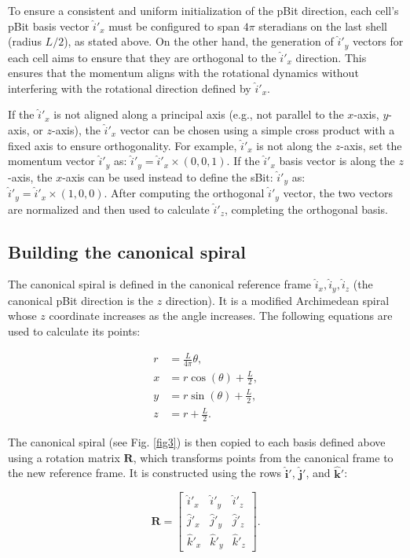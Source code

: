 \documentclass[12pt,english]{article}
\begin{document}
To ensure a consistent and uniform initialization of the pBit direction, each cell's pBit basis vector $\hat{i}'_x$ must be configured to span $4\pi$ steradians on the last shell (radius $L/2$), as stated above. On the other hand, the generation of $\hat{i}'_y$ vectors for each cell aims to ensure that they are orthogonal to the $\hat{i}'_x$ direction. This ensures that the momentum aligns with the rotational dynamics without interfering with the rotational direction defined by $\hat{i}'_x$.

If the $\hat{i}'_x$ is not aligned along a principal axis (e.g., not parallel to the $x$-axis, $y$-axis, or $z$-axis), the $\hat{i}'_x$ vector can be chosen using a simple cross product with a fixed axis to ensure orthogonality. For example, $\hat{i}'_x$ is not along the $z$-axis, set the momentum vector $\hat{i}'_y$ as: $\hat{i}'_y=\hat{i}'_x\times(0,0,1)$. If the $\hat{i}'_x$ basis vector is along the $z$-axis, the $x$-axis can be used instead to define the sBit: $\hat{i}'_y$ as: $\hat{i}'_y=\hat{i}'_x\times(1,0,0)$. After computing the orthogonal $\hat{i}'_y$ vector, the two vectors are normalized and then used to calculate $\hat{i}'_z$, completing the orthogonal basis.

\subsection{Building the canonical spiral}

The canonical spiral is defined in the canonical reference frame $\hat{i}_x, \hat{i}_y, \hat{i}_z$ (the canonical pBit direction is the $z$ direction). It is a modified Archimedean spiral whose $z$ coordinate increases as the angle increases. The following equations are used to calculate its points:

\begin{align}
r &= \frac{L}{4\pi} \theta, \\
x &= r \cos(\theta) + \frac{L}{2}, \\
y &= r \sin(\theta) + \frac{L}{2}, \\
z &= r + \frac{L}{2}.
\end{align}

The canonical spiral (see Fig. \ref{fig3}) is then copied to each basis defined above using a rotation matrix $\mathbf{R}$, which transforms points from the canonical frame to the new reference frame. It is constructed using the rows $\hat{\mathbf{i}}'$, $\hat{\mathbf{j}}'$, and $\hat{\mathbf{k}}'$:

\[
\mathbf{R} = 
\begin{bmatrix}
    \hat{i}'_x & \hat{i}'_y & \hat{i}'_z \\
    \hat{j}'_x & \hat{j}'_y & \hat{j}'_z \\
    \hat{k}'_x & \hat{k}'_y & \hat{k}'_z
\end{bmatrix}.
\]
\end{document}
